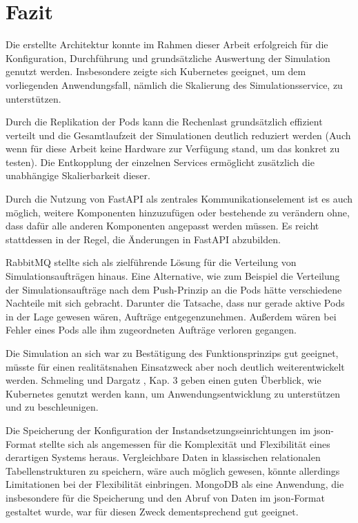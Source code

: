 \documentclass[11pt,a4paper]{article}
\begin{document}
\section{Fazit}
Die erstellte Architektur konnte im Rahmen dieser Arbeit erfolgreich für die Konfiguration, Durchführung und grundsätzliche
Auswertung der Simulation genutzt werden. 
Insbesondere zeigte sich Kubernetes geeignet, um dem vorliegenden Anwendungsfall, nämlich die Skalierung des Simulationsservice,
zu unterstützen. 

Durch die Replikation der Pods kann die Rechenlast grundsätzlich effizient verteilt und 
die Gesamtlaufzeit der Simulationen deutlich reduziert werden 
(Auch wenn für diese Arbeit keine Hardware zur Verfügung stand, um das konkret zu testen).
Die Entkopplung der einzelnen Services ermöglicht zusätzlich die unabhängige Skalierbarkeit dieser.

Durch die Nutzung von FastAPI als zentrales Kommunikationselement ist es auch möglich, weitere Komponenten hinzuzufügen
oder bestehende zu verändern ohne, dass dafür alle anderen Komponenten angepasst werden müssen.
Es reicht stattdessen in der Regel, die Änderungen in FastAPI abzubilden.

RabbitMQ stellte sich als zielführende Lösung für die Verteilung von Simulationsaufträgen hinaus.
Eine Alternative, wie zum Beispiel die Verteilung der Simulationsaufträge nach dem Push-Prinzip an die Pods
hätte verschiedene Nachteile mit sich gebracht. Darunter die Tatsache, dass nur gerade aktive Pods
in der Lage gewesen wären, Aufträge entgegenzunehmen. Außerdem wären bei Fehler eines Pods alle
ihm zugeordneten Aufträge verloren gegangen.

Die Simulation an sich war zu Bestätigung des Funktionsprinzips gut geeignet,
müsste für einen realitätsnahen Einsatzweck aber noch deutlich weiterentwickelt werden.
Schmeling und Dargatz \cite{Schmeling_Dargatz_2022}, Kap. 3 geben einen guten Überblick,
wie Kubernetes genutzt werden kann, um Anwendungsentwicklung zu unterstützen und zu beschleunigen.

Die Speicherung der Konfiguration der Instandsetzungseinrichtungen im json-Format stellte sich als 
angemessen für die Komplexität und Flexibilität eines derartigen Systems heraus. 
Vergleichbare Daten in klassischen relationalen Tabellenstrukturen zu speichern, wäre auch
möglich gewesen, könnte allerdings Limitationen bei der Flexibilität einbringen.
MongoDB als eine Anwendung, die insbesondere für die Speicherung und den Abruf von
Daten im json-Format gestaltet wurde, war für diesen Zweck dementsprechend gut geeignet.
\end{document}
